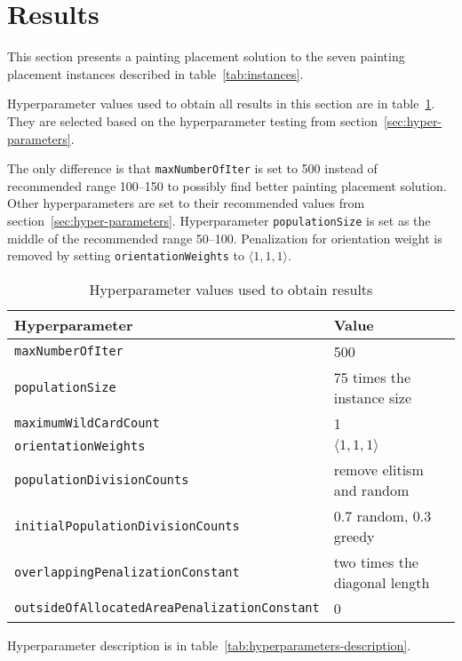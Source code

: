 \clearpage%
\newpage


\section{Results}\label{sec:results}
This section presents a painting placement solution to the seven painting placement instances described in table~\ref{tab:instances}.

Hyperparameter values used to obtain all results in this section are in table~\ref{tab:hyperparameters-values}.
They are selected based on the hyperparameter testing from section~\ref{sec:hyper-parameters}.

The only difference is that \verb|maxNumberOfIter| is set to 500 instead of recommended range \numrange{100}{150} to possibly find better painting placement solution.
Other hyperparameters are set to their recommended values from section~\ref{sec:hyper-parameters}.
Hyperparameter \verb|populationSize| is set as the middle of the recommended range \numrange{50}{100}.
Penalization for orientation weight is removed by setting \verb|orientationWeights| to $\langle 1,1,1\rangle$.


\begin{table}[h!]
    \caption{Hyperparameter values used to obtain results}
    \label{tab:hyperparameters-values}
    \begin{threeparttable}
        \begin{tabular}{ll}
            \hline
            \textbf{Hyperparameter}                           & \textbf{Value}                \\ \hline
            \verb|maxNumberOfIter|                            & 500                           \\ \hline
            \verb|populationSize|                             & 75 times the instance size    \\ \hline
            \verb|maximumWildCardCount|                       & 1                             \\ \hline
            \verb|orientationWeights|                         & $\langle 1,1,1 \rangle$       \\ \hline
            \verb|populationDivisionCounts|                   & remove elitism and random     \\ \hline
            \verb|initialPopulationDivisionCounts|            & 0.7 random, 0.3 greedy        \\ \hline
            \verb|overlappingPenalizationConstant|            & two times the diagonal length \\ \hline
            \verb|outsideOfAllocatedAreaPenalizationConstant| & 0                             \\ \hline
        \end{tabular}
        \begin{tablenotes}
            \small
            \item Hyperparameter description is in table~\ref{tab:hyperparameters-description}.
        \end{tablenotes}
    \end{threeparttable}
\end{table}


